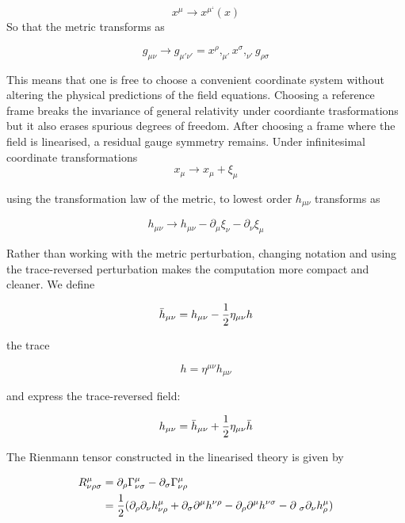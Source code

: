 \documentclass[binding=0.6cm, LaM]{sapthesis}
\begin{document}
		\begin{equation}
		x^{\mu} \rightarrow x^{\mu ‘}(x)
		\end{equation}
	So that the metric transforms as

		\begin{equation}
		g_{\mu\nu} \rightarrow g_{\mu' \nu'} = x^{\rho},_{\mu'}x^{\sigma},_{\nu'}g_{\rho \sigma}
		\end{equation}

	This means that one is free to choose a convenient coordinate system without 
	altering the physical predictions of the field equations.
	Choosing a reference frame breaks the invariance of general relativity under 
	coordiante trasformations but it also erases spurious degrees of freedom. 
	After choosing a frame where the field is linearised, 
	a residual gauge symmetry remains. 
	Under infinitesimal coordinate transformations
                 \[
		x_{\mu} \rightarrow x_{\mu} + \xi_{\mu}
                \]

	using the transformation law of the metric, to lowest order $h_{\mu\nu}$ transforms as
			
		\[
		h_{\mu\nu} \rightarrow h_{\mu\nu} - \partial_{\mu}\xi_{\nu} - \partial_{\nu}\xi_{\mu}
		\]

	Rather than working with the metric perturbation, changing notation and using the trace-reversed perturbation 
	makes the computation more compact and cleaner. We define
	
		\begin{equation}
		{\bar h}_{\mu\nu} = h_{\mu\nu} - {1 \over {2}}\eta_{\mu\nu}h  
		\end{equation}

	the trace
	
		\begin{equation}
		h = \eta^{\mu\nu}h_{\mu\nu}
		\end{equation}

	and express the trace-reversed field:

		\begin{equation}
		h_{\mu\nu} = {\bar h}_{\mu\nu} + {1 \over {2}}\eta_{\mu\nu}{\bar h}
		\end{equation}

	The Rienmann tensor constructed in the linearised theory is given by

		\begin{align}
		R^{\mu}_{\nu\rho\sigma} &= \partial_{\rho} \Gamma^{\mu}_{\nu\sigma} - \partial_{\sigma}\Gamma^{\mu}_{\nu\rho}  \\
				       &= {1 \over 2} (\partial_{\rho}\partial_{\nu}h^{\mu}_{\nu\rho} + \partial_{\sigma}\partial^{\mu}h^{\nu\rho} - \partial_{\rho}\partial^{\mu}h^{\nu\sigma} - \partial_{\					     \sigma}\partial_{\nu}h^{\mu}_{\rho})
		\end{align}
\end{document}
